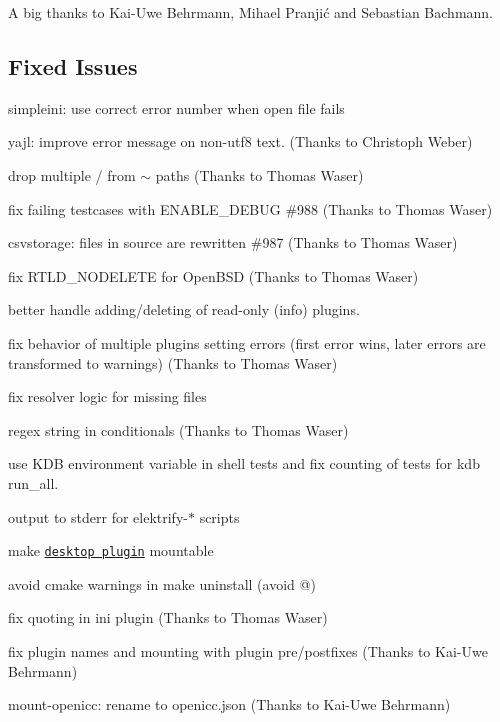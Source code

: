 A big thanks to Kai-\/\+Uwe Behrmann, Mihael Pranjić and Sebastian Bachmann.

\subsection*{Fixed Issues}


\begin{DoxyItemize}
\item simpleini\+: use correct error number when open file fails
\item yajl\+: improve error message on non-\/utf8 text. (Thanks to Christoph Weber)
\item drop multiple {\ttfamily /} from {\ttfamily $\sim$} paths (Thanks to Thomas Waser)
\item fix failing testcases with {\ttfamily E\+N\+A\+B\+L\+E\+\_\+\+D\+E\+B\+UG} \#988 (Thanks to Thomas Waser)
\item csvstorage\+: files in source are rewritten \#987 (Thanks to Thomas Waser)
\item fix R\+T\+L\+D\+\_\+\+N\+O\+D\+E\+L\+E\+TE for Open\+B\+SD (Thanks to Thomas Waser)
\item better handle adding/deleting of read-\/only (info) plugins.
\item fix behavior of multiple plugins setting errors (first error wins, later errors are transformed to warnings) (Thanks to Thomas Waser)
\item fix resolver logic for missing files
\item regex string in conditionals (Thanks to Thomas Waser)
\item use {\ttfamily K\+DB} environment variable in shell tests and fix counting of tests for {\ttfamily kdb run\+\_\+all}.
\item output to {\ttfamily stderr} for {\ttfamily elektrify-\/$\ast$} scripts
\item make \href{https://master.libelektra.org/src/plugins/desktop}{\tt desktop plugin} mountable
\item avoid cmake warnings in {\ttfamily make uninstall} (avoid {\ttfamily @})
\item fix quoting in ini plugin (Thanks to Thomas Waser)
\item fix plugin names and mounting with plugin pre/postfixes (Thanks to Kai-\/\+Uwe Behrmann)
\item mount-\/openicc\+: rename to openicc.\+json (Thanks to Kai-\/\+Uwe Behrmann)
\end{DoxyItemize}

